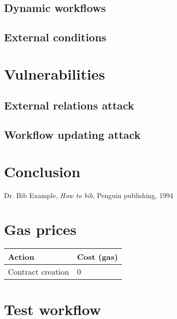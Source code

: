 \documentclass{paper}
\begin{document}
		\subsection{Dynamic workflows}

		\subsection{External conditions}

	\section{Vulnerabilities}

		\subsection{External relations attack}

		\subsection{Workflow updating attack}

	\section{Conclusion}

	\pagebreak
	\begin{thebibliography}{99}

		Dr. Bib Example,
		\textit{How to bib},
		Penguin publishing,
		1994

	\end{thebibliography}

	\appendix

	\section{Gas prices}

		\begin{tabular}{| l | l |}
			\hline
			Action & Cost (gas) \\ \hline
			Contract creation & 0 \\
			\hline
		\end{tabular}

	\section{Test workflow}
\end{document}
